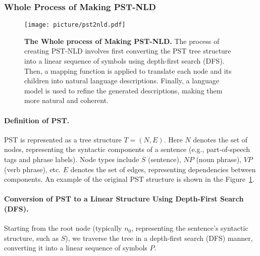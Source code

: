 \subsubsection{Whole Process of Making PST-NLD}
\label{app:make_pst_nld}
\begin{figure}[!ht]
\centering
\vspace{0.1in}
\texttt{[image: picture/pst2nld.pdf]}
\vspace{0.1in}
\caption{\textbf{The Whole process of Making PST-NLD.} The process of creating PST-NLD involves first converting the PST tree structure into a linear sequence of symbols using depth-first search (DFS). Then, a mapping function is applied to translate each node and its children into natural language descriptions. Finally, a language model is used to refine the generated descriptions, making them more natural and coherent.}
\label{fig:pst2nld}
\vspace{0.1in}
\end{figure}

\paragraph{Definition of PST.}
    PST is represented as a tree structure \( T = (N, E) \). Here \( N \) denotes the set of nodes, representing the syntactic components of a sentence (e.g., part-of-speech tags and phrase labels). Node types include \( S \) (sentence), \( NP \) (noun phrase), \( VP \) (verb phrase), etc.  \( E \) denotes the set of edges, representing dependencies between components.
    An example of the original PST structure is shown in the Figure~\ref{fig:pst2nld}.

\paragraph{Conversion of PST to a Linear Structure Using Depth-First Search (DFS).}
    Starting from the root node (typically \( n_0 \), representing the sentence's syntactic structure, such as \( S \)), we traverse the tree in a depth-first search (DFS) manner, converting it into a linear sequence of symbols \( P \).

